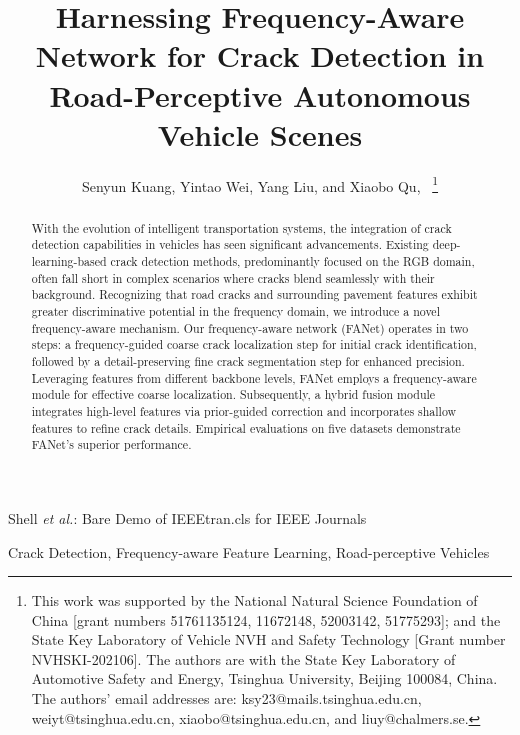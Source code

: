 \documentclass[journal]{IEEEtran}
\begin{document}
\title{Harnessing Frequency-Aware Network for Crack Detection in Road-Perceptive Autonomous Vehicle Scenes}


\author{Senyun Kuang, Yintao Wei, Yang Liu, and Xiaobo Qu,~%
\thanks{This work was supported by the National Natural Science Foundation of China [grant numbers 51761135124, 11672148, 52003142, 51775293]; and the State Key Laboratory of Vehicle NVH and Safety Technology [Grant number NVHSKI-202106]. The authors are with the State Key Laboratory of Automotive Safety and Energy, Tsinghua University, Beijing 100084, China. The authors' email addresses are: ksy23@mails.tsinghua.edu.cn, weiyt@tsinghua.edu.cn, xiaobo@tsinghua.edu.cn, and liuy@chalmers.se.}}

%
{Shell \MakeLowercase{\textit{et al.}}: Bare Demo of IEEEtran.cls for IEEE Journals}

\maketitle


\begin{abstract}
With the evolution of intelligent transportation systems, the integration of crack detection capabilities in vehicles has seen significant advancements. Existing deep-learning-based crack detection methods, predominantly focused on the RGB domain, often fall short in complex scenarios where cracks blend seamlessly with their background. Recognizing that road cracks and surrounding pavement features exhibit greater discriminative potential in the frequency domain, we introduce a novel frequency-aware mechanism. Our frequency-aware network (FANet) operates in two steps: a frequency-guided coarse crack localization step for initial crack identification, followed by a detail-preserving fine crack segmentation step for enhanced precision. Leveraging features from different backbone levels, FANet employs a frequency-aware module for effective coarse localization. Subsequently, a hybrid fusion module integrates high-level features via prior-guided correction and incorporates shallow features to refine crack details. Empirical evaluations on five datasets demonstrate FANet's superior performance.
\end{abstract}

\begin{IEEEkeywords}
Crack Detection, Frequency-aware Feature Learning, Road-perceptive Vehicles
\end{IEEEkeywords}
\end{document}
